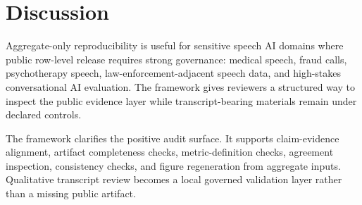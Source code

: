 \section{Discussion}

Aggregate-only reproducibility is useful for sensitive speech AI domains where public row-level release requires strong governance: medical speech, fraud calls, psychotherapy speech, law-enforcement-adjacent speech data, and high-stakes conversational AI evaluation. The framework gives reviewers a structured way to inspect the public evidence layer while transcript-bearing materials remain under declared controls.

The framework clarifies the positive audit surface. It supports claim-evidence alignment, artifact completeness checks, metric-definition checks, agreement inspection, consistency checks, and figure regeneration from aggregate inputs. Qualitative transcript review becomes a local governed validation layer rather than a missing public artifact.
